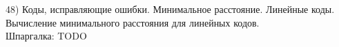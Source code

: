 48) Коды, исправляющие ошибки. Минимальное расстояние. Линейные коды. Вычисление минимального расстояния для линейных кодов.\\

Шпаргалка: TODO\\
